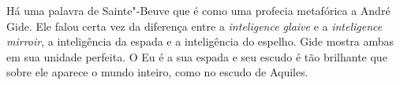 Há uma palavra de Sainte"-Beuve que é como uma profecia metafórica a
André Gide. Ele falou certa vez da diferença entre a \emph{inteligence glaive} e a
\emph{inteligence mirroir}, a inteligência da espada e a inteligência do espelho.
Gide mostra ambas em sua unidade perfeita. O Eu é a sua espada e seu
escudo é tão brilhante que sobre ele aparece o mundo inteiro, como no escudo de Aquiles.
